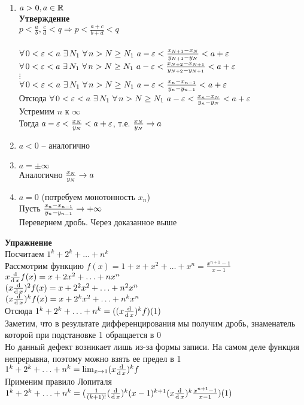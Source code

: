 \documentclass[12pt]{article}
\begin{document}
\begin{enumerate}
    \item $a > 0, a \in \mathbb{R}$\\
    \textbf{Утверждение}\\
    $p < \frac ab,\frac cd < q \Rightarrow p < \frac{a + c}{b + d} < q$\\\\
    $\forall\, 0 < \varepsilon < a\ \exists\, N_1\ \forall\, n > N \geq N_1\ a-\varepsilon < \frac{x_{N+1} - x_N}{y_{N+1} - y_N} < a + \varepsilon$
    $\forall\, 0 < \varepsilon < a\ \exists\, N_1\ \forall\, n > N \geq N_1\ a-\varepsilon < \frac{x_{N+2} - x_{N+1}}{y_{N+2} - y_{N+1}} < a + \varepsilon$\\
    $\vdots$\\
    $\forall\, 0 < \varepsilon < a\ \exists\, N_1\ \forall\, n > N \geq N_1\ a-\varepsilon < \frac{x_n - x_{n-1}}{y_n - y_{n-1}} < a + \varepsilon$\\
    Отсюда $\fall 0 < \eps < a\ \ex N_1\ \fall n > N \geq N_1\ a-\eps < \frac{x_n - x_N}{y_n - y_N} < a + \eps$\\
    Устремим $n$ к $\infty$\\
    Тогда $a-\varepsilon < \frac{x_N}{y_N} < a + \varepsilon$, т.е. $\frac{x_N}{y_N} \rightarrow a$
    \item $a < 0$ -- аналогично
    \item $a = \pm\infty$\\
    Аналогично $\frac{x_N}{y_N} \rightarrow a$
    \item $a = 0$ (потребуем монотонность $x_n$)\\
    Пусть $\frac{x_n-x_{n-1}}{y_n-y_{n-1}} \rightarrow +\infty$\\
    Перевернем дробь. Через доказанное выше
\end{enumerate}
\textbf{Упражнение}\\
Посчитаем $1^k + 2^k + \ldots + n^k$\\
Рассмотрим функцию $f(x) = 1 + x + x^2 + \ldots + x^n = \frac{x^{n+1}-1}{x-1}$\\
$x\frac{\operatorname{d}}{\operatorname{d} x} f(x) = x + 2x^2 + \ldots + nx^n$\\
$(x\frac{\operatorname{d}}{\operatorname{d} x})^2 f(x) = x + 2^2x^2 + \ldots + n^2x^n$\\
$(x\frac{\operatorname{d}}{\operatorname{d} x})^k f(x) = x + 2^kx^2 + \ldots + n^kx^n$\\
Отсюда $1^k + 2^k + \ldots + n^k = ((x\frac{\operatorname{d}}{\operatorname{d} x})^k f)(1)$\\
Заметим, что в результате дифференцирования мы получим дробь, знаменатель которой при подстановке 1 обращается в 0\\
Но данный дефект возникает лишь из-за формы записи. На самом деле функция непрерывна, поэтому можно взять ее предел в 1\\
$1^k + 2^k + \ldots + n^k = \lim_{x \rightarrow 1} (x\frac{\operatorname{d}}{\operatorname{d} x})^k f$\\
Применим правило Лопиталя\\
$1^k + 2^k + \ldots + n^k = (\frac1{(k+1)!}(\frac{\operatorname{d}}{\operatorname{d} x})^k (x-1)^{k+1}(x\frac{\operatorname{d}}{\operatorname{d} x})^k \frac{x^{n+1}-1}{x-1}) (1)$
\end{document}

